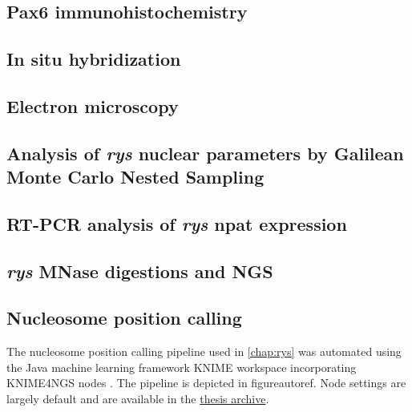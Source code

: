 \subsection{Pax6 immunohistochemistry}

\subsection{In situ hybridization}

\subsection{Electron microscopy}

\subsection{Analysis of \textit{rys} nuclear parameters by Galilean Monte Carlo Nested Sampling}

\subsection{RT-PCR analysis of \textit{rys} npat expression}

\subsection{\textit{rys} MNase digestions and NGS}

\subsection{Nucleosome position calling}
The nucleosome position calling pipeline used in \autoref{chap:rys} was automated using the Java machine learning framework KNIME \cite{Dietz2016} workspace incorporating KNIME4NGS nodes \cite{Hastreiter2017}. The pipeline is depicted in figureautoref. Node settings are largely default and are available in the  \hyperref[sec:archive]{thesis archive}.

